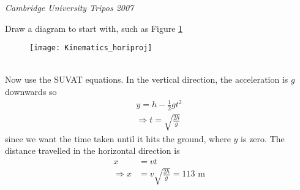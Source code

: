 



\begin{problem} %
{ 
\vspace{-0.3cm}
}
{\textit{Cambridge University Tripos 2007}}
{Draw a diagram to start with, such as Figure \ref{fig:Kinematics_horiproj}
\begin{figure}[h]
\centering
\texttt{[image: Kinematics\_horiproj]}
\caption{}
\label{fig:Kinematics_horiproj}
\end{figure}
\\
Now use the SUVAT equations. In the vertical direction, the acceleration is $g$ downwards so
\begin{align*}
y=h-\frac{1}{2}gt^2 \\
\Rightarrow t=\sqrt{\frac{2h}{g}}
\end{align*}
since we want the time taken until it hits the ground, where $y$ is zero. The distance travelled in the horizontal direction is 
\begin{align*}
x&=vt \\
\Rightarrow x&=v\sqrt{\frac{2h}{g}}=113\textrm{ m}
\end{align*}
}
\end{problem}